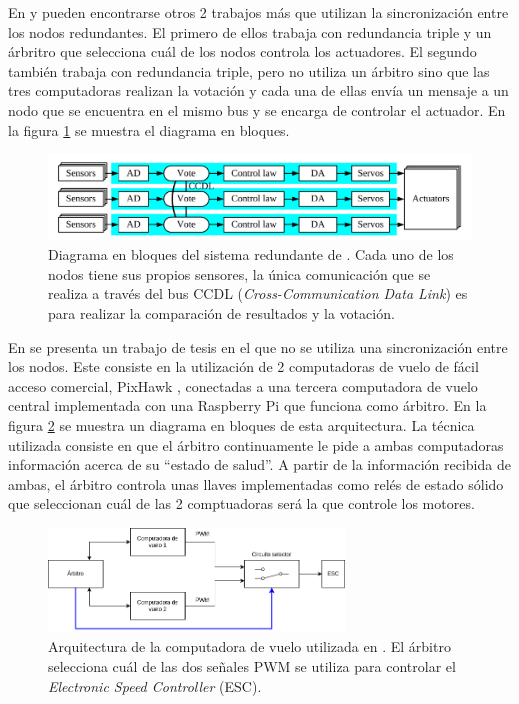 En \cite{chen2015design} y \cite{wang2008development} pueden encontrarse otros 2 trabajos más que utilizan la sincronización entre los nodos redundantes. El primero de ellos trabaja con redundancia triple y un árbritro que selecciona cuál de los nodos controla los actuadores. El segundo también trabaja con redundancia triple, pero no utiliza un árbitro sino que las tres computadoras realizan la votación y cada una de ellas envía un mensaje a un nodo que se encuentra en el mismo bus y se encarga de controlar el actuador. En la figura \ref{fig:RS_485_sync} se muestra el diagrama en bloques.

\begin{figure}[H]
    \centering
    \includegraphics[width=\textwidth]{img/RS_485_sync.png}
    \caption{Diagrama en bloques del sistema redundante de \cite{wang2008development}. Cada uno de los nodos tiene sus propios sensores, la única comunicación que se realiza a través del bus CCDL (\textit{Cross-Communication Data Link}) es para realizar la comparación de resultados y la votación.}
    \label{fig:RS_485_sync}
\end{figure}

En \cite{thesis_redundant_ROS} se presenta un trabajo de tesis en el que no se utiliza una sincronización entre los nodos. Este consiste en la utilización de 2 computadoras de vuelo de fácil acceso comercial, PixHawk \cite{dronecode-foundation-2023}, conectadas a una tercera computadora de vuelo central implementada con una Raspberry Pi que funciona como árbitro. En la figura \ref{fig:ROS_redundancy} se muestra un diagrama en bloques de esta arquitectura. La técnica utilizada consiste en que el árbitro continuamente le pide a ambas computadoras información acerca de su ``estado de salud''. A partir de la información recibida de ambas, el árbitro controla unas llaves implementadas como relés de estado sólido que seleccionan cuál de las 2 comptuadoras será la que controle los motores.

\begin{figure}[H]
    \centering
    \includegraphics[width=0.7\textwidth]{img/ROS_redundancy.png}
    \caption{Arquitectura de la computadora de vuelo utilizada en \cite{thesis_redundant_ROS}. El árbitro selecciona cuál de las dos señales PWM se utiliza para controlar el \textit{Electronic Speed Controller} (ESC).}
    \label{fig:ROS_redundancy}
\end{figure}

